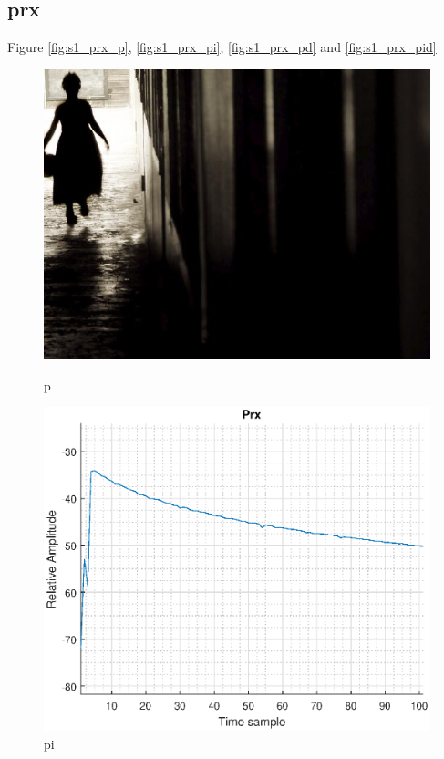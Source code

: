 \subsection{prx}
Figure \ref{fig:s1_prx_p}, \ref{fig:s1_prx_pi}, \ref{fig:s1_prx_pd} and \ref{fig:s1_prx_pid}
\begin{figure}[H]
\begin{minipage}[t]{0.45\textwidth}
\includegraphics[width=\linewidth]{figures/randomfigure.jpg}
\caption{p}
\label{fig:s1_prx_p}
\end{minipage}
\hspace{\fill}
\begin{minipage}[t]{0.45\textwidth}
\includegraphics[width=\linewidth]{figures/s1_pi_prx.eps}
\caption{pi}
\label{fig:s1_pi_prx}
\end{minipage}


\end{figure}
